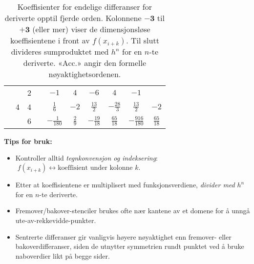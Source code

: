 \begin{table}[H]
\begin{tabular}{|c|c|c|c|c|c|c|c|c|c|}
                                                          & \multirow{3}{*}{4}           & 2                           &                  & $-1$             & $4$             & $-6$             & $4$               & $-1$               &                  \\ \cline{3-10}
                                                          &                              & 4                           &                  & $\frac{1}{6}$    & $-2$            & $\frac{13}{2}$   & $-\frac{28}{3}$   & $\frac{13}{2}$     & $-2$             \\ \cline{3-10}
                                                          &                              & 6                           &                  & $-\frac{1}{180}$ & $\frac{2}{9}$   & $-\frac{19}{18}$ & $\frac{65}{18}$   & $-\frac{916}{180}$ & $\frac{65}{18}$  \\ \hline
    \end{tabular}
    \caption{Koeffisienter for endelige differanser for deriverte opptil fjerde orden.
        Kolonnene \(\mathbf{-3}\) til \(\mathbf{+3}\) (eller mer) viser de dimensjonsløse koeffisientene i front av \(f(x_{i+k})\).
        Til slutt divideres sumproduktet med \(h^n\) for en \(n\)-te deriverte.
        «Acc.» angir den formelle nøyaktighetsordenen.}
    \label{tab:finite_difference_table}
\end{table}

\vspace{1em}

\noindent\textbf{Tips for bruk:}
\begin{itemize}
    \item Kontroller alltid \emph{tegnkonvensjon og indeksering}:
          \(\;f(x_{i+k}) \leftrightarrow \text{koeffisient under kolonne }k\).
    \item Etter at koeffisientene er multiplisert med funksjonsverdiene, \emph{divider med} \(h^n\) for en \(n\)-te deriverte.
    \item Fremover/bakover-stenciler brukes ofte nær kantene av et domene for å unngå ute-av-rekkevidde-punkter.
    \item Sentrerte differanser gir vanligvis høyere nøyaktighet enn fremover- eller bakoverdifferanser, siden de utnytter symmetrien rundt punktet ved å bruke naboverdier likt på begge sider.
\end{itemize}




